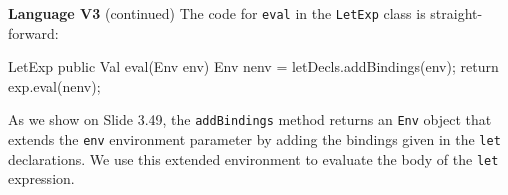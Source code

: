 \begin{minipage}[t]{\sw}
\slidenumber
\LARGE
{\bf Language V3} (continued)\exx
\Large
\emm{}\exx
\LARGE
The code for \verb'eval' in the \verb'LetExp' class is straight-forward:
\Large
\begin{qv}
LetExp
    public Val eval(Env env) {
        Env nenv = letDecls.addBindings(env);
        return exp.eval(nenv);
    }
\end{qv}
\LARGE
As we show on Slide 3.49,
the \verb'addBindings' method returns an \verb'Env' object
that extends the \verb'env' environment parameter
by adding the bindings given in the \verb'let' declarations.
We use this extended environment
to evaluate the body of the \verb'let' expression.
\end{minipage}

\clearpage
